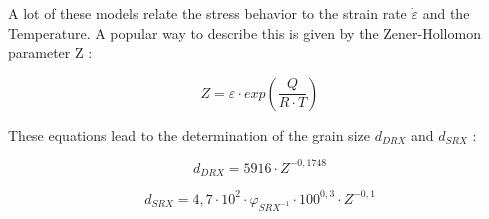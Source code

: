 A lot of these models relate the stress behavior to the strain rate $\dot{\varepsilon}$ and the Temperature. A popular way to describe this is given by the Zener-Hollomon parameter Z \cite{ZEN44}:

\begin{equation}
 Z =  \varepsilon\cdot exp\left( \frac{Q}{R\cdot T}\right)
\end{equation}

These equations lead to the determination of the grain size $d_{DRX}$ and $d_{SRX}$ \cite{DEG08}:

\begin{equation}
 d_{DRX} =  5916\cdot Z^{-0,1748}
\end{equation}

\begin{equation}
 d_{SRX} =  4,7\cdot10^{2}\cdot\varphi_{SRX^{-1}}\cdot100^{0,3}\cdot Z^{-0,1}
\end{equation}
